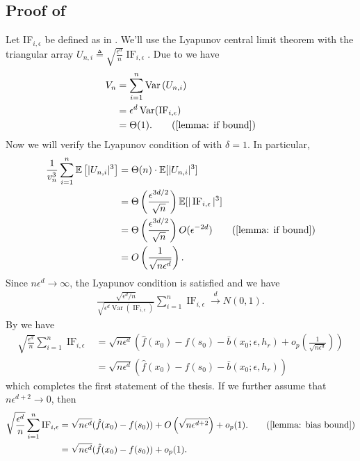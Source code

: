 \documentclass[11pt]{article}
\begin{document}
\subsection{Proof of } \label{sec: proof of f clt}
Let IF$_{i, \epsilon}$ be defined as in . We'll use the Lyapunov central limit theorem  with the triangular array $U_{n, i}\triangleq \sqrt{\frac{\epsilon^d}{n}}\operatorname{IF}_{i, \epsilon}.$ Due to  we have
\begin{align*}
    V_n &= \sum_{i = 1}^n\operatorname{Var}\left(U_{n, i}\right)\\ 
    &= \epsilon^d\operatorname{Var}(\operatorname{IF}_{i, \epsilon}) \\
    &= \Theta(1). \tag{\Cref{lemma: if bound}}
\end{align*}
Now we will verify the Lyapunov condition of  with $\delta = 1$. In particular,
\begin{align*}
    \frac{1}{v_n^{3}}\sum_{i = 1}^n \mathbb{E}\left[|U_{n, i}|^{3}\right] &= \Theta(n)\cdot \mathbb{E}[|U_{n, i}|^3] \\
    &= \Theta\left(\frac{\epsilon^{3d/2}}{\sqrt{n}}\right)\mathbb{E}[|\operatorname{IF}_{i, \epsilon}|^3] \\
    &= \Theta\left(\frac{\epsilon^{3d/2}}{\sqrt{n}}\right)O(\epsilon^{-2d}) \tag{\Cref{lemma: if bound}} \\
    &= O\left(\frac{1}{\sqrt{n\epsilon^d}}\right).
\end{align*}
Since $n\epsilon^d \rightarrow \infty$, the Lyapunov condition is satisfied and we have
\begin{align*}
    \frac{\sqrt{\epsilon^d/n}}{\sqrt{\epsilon^d\operatorname{Var}(\operatorname{IF}_{i, \epsilon})}}\sum_{i = 1}^n\operatorname{IF}_{i, \epsilon} \overset{d}{\rightarrow} N(0, 1).
\end{align*}
By  we have 
\begin{align*}
    \sqrt{\frac{\epsilon^d}{n}} \sum_{i = 1}^n\operatorname{IF}_{i, \epsilon} &= \sqrt{n\epsilon^d}\left(\hat{f}(x_0) - f(s_0) - \bar{b}(x_0; \epsilon, h_r) + o_p\left(\frac{1}{\sqrt{n\epsilon^d}}\right)\right) \\
    &= \sqrt{n\epsilon^d}\left(\hat{f}(x_0) - f(s_0) - \bar{b}(x_0; \epsilon, h_r)\right)
\end{align*}
which completes the first statement of the thesis. If we further assume that $n\epsilon^{d+2} \rightarrow 0$, then
\begin{align*}
    \sqrt{\frac{\epsilon^d}{n}} \sum_{i = 1}^n\operatorname{IF}_{i, \epsilon}&= \sqrt{n\epsilon^d}(\hat{f}(x_0) - f(s_0) )  + O\left(\sqrt{n\epsilon^{d+2}}\right) + o_p(1). \tag{\Cref{lemma: bias bound}} \\
    &= \sqrt{n\epsilon^d}(\hat{f}(x_0) - f(s_0) ) + o_p(1). 
\end{align*}
\end{document}
